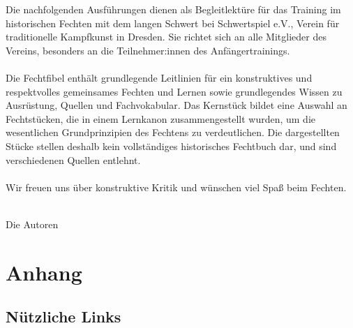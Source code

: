 Die nachfolgenden Ausführungen dienen als Begleitlektüre für das Training im historischen Fechten mit dem langen Schwert bei Schwertspiel e.V., Verein für traditionelle Kampfkunst in Dresden.
Sie richtet sich an alle Mitglieder des Vereins, besonders an die Teilnehmer:innen des Anfängertrainings.
\\
\\
Die Fechtfibel enthält grundlegende Leitlinien für ein konstruktives und respektvolles gemeinsames Fechten und Lernen sowie grundlegendes Wissen zu Ausrüstung, Quellen und Fachvokabular.
Das Kernstück bildet eine Auswahl an Fechtstücken, die in einem Lernkanon zusammengestellt wurden, um die wesentlichen Grundprinzipien des Fechtens zu verdeutlichen.
Die dargestellten Stücke stellen deshalb kein vollständiges historisches Fechtbuch dar, und sind verschiedenen Quellen entlehnt.
\\
\\
Wir freuen uns über konstruktive Kritik und wünschen viel Spaß beim Fechten.
\\
\\
\begin{center}
    Die Autoren
\end{center}

\newpage

\tableofcontents

\newpage
 




\section{Anhang}

\subsection{Nützliche Links}
\label{sec:nuetzliche_links}

